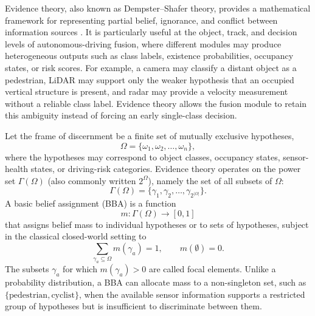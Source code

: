 Evidence theory, also known as Dempster--Shafer theory, provides a mathematical framework for representing partial belief, ignorance, and conflict between information sources \cite{shafer_mathematical_1976,dempster_upperlower_2008,smets_transferable_1990}. It is particularly useful at the object, track, and decision levels of autonomous-driving fusion, where different modules may produce heterogeneous outputs such as class labels, existence probabilities, occupancy states, or risk scores. For example, a camera may classify a distant object as a pedestrian, LiDAR may support only the weaker hypothesis that an occupied vertical structure is present, and radar may provide a velocity measurement without a reliable class label. Evidence theory allows the fusion module to retain this ambiguity instead of forcing an early single-class decision.

Let the frame of discernment be a finite set of mutually exclusive hypotheses,
\begin{equation}
\Omega = \{\omega_1, \omega_2, \ldots, \omega_n\},
\end{equation}
where the hypotheses may correspond to object classes, occupancy states, sensor-health states, or driving-risk categories. Evidence theory operates on the power set \(\Gamma(\Omega)\) (also commonly written $2^{\Omega}$), namely the set of all subsets of \(\Omega\):
\begin{equation}
\Gamma(\Omega) = \{\gamma_1, \gamma_2, \ldots, \gamma_{2^{|\Omega|}}\}.
\end{equation}
A basic belief assignment (BBA) is a function
\begin{equation}
m: \Gamma(\Omega) \rightarrow [0,1]
\end{equation}
that assigns belief mass to individual hypotheses or to sets of hypotheses, subject in the classical closed-world setting to
\begin{equation}
\sum_{\gamma_a \subseteq \Omega} m(\gamma_a)=1, \qquad m(\emptyset)=0.
\label{eq:bba}
\end{equation}
The subsets \(\gamma_a\) for which \(m(\gamma_a)>0\) are called focal elements. Unlike a probability distribution, a BBA can allocate mass to a non-singleton set, such as \(\{\text{pedestrian},\text{cyclist}\}\), when the available sensor information supports a restricted group of hypotheses but is insufficient to discriminate between them.

